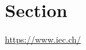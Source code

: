 \documentclass[../main.tex]{subfiles}
\begin{document}
\section{Section}

\cite{IEC61966-2-1-Amd1}
\url{https://www.iec.ch/}


\ifSubfilesClassLoaded{%
    \twocolumn
}{}
\end{document}
